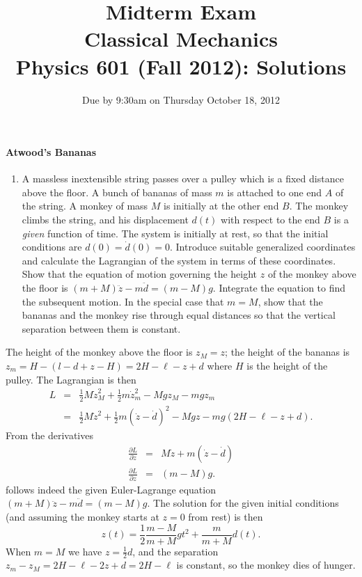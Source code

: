 \documentclass[letterpaper,11pt]{article}
\title{Midterm Exam \\ Classical Mechanics \\ Physics 601 (Fall 2012): Solutions}
\date{Due by 9:30am on Thursday October 18, 2012}
\begin{document}
\maketitle

\paragraph*{Atwood's Bananas}
\begin{enumerate}
 \item A massless inextensible string passes over a pulley which is a fixed distance above the floor.  A bunch of bananas of mass $m$ is attached to one end $A$ of the string.  A monkey of mass $M$ is initially at the other end $B$. The monkey climbs the string, and his displacement $d(t)$ with respect to the end $B$ is a \emph{given} function of time.  The system is initially at rest, so that the initial conditions are $d(0) = \dot{d}(0) = 0$.  Introduce suitable generalized coordinates and calculate the Lagrangian of the system in terms of these coordinates.  Show that the equation of motion governing the height $z$ of the monkey above the floor is $(m+M)\ddot{z} - m\ddot{d} = (m-M)g$.  Integrate the equation to find the subsequent motion.  In the special case that $m = M$, show that the bananas and the monkey rise through equal distances so that the vertical separation between them is constant.
\end{enumerate}
The height of the monkey above the floor is $z_M = z$; the height of the bananas is $z_m = H - (l - d + z - H) = 2 H - \ell - z + d$ where $H$ is the height of the pulley.  The Lagrangian is then
\begin{eqnarray*}
 L & = & \frac{1}{2} M \dot{z}_M^2 + \frac{1}{2} m \dot{z}_m^2 - Mgz_M - mgz_m \\
   & = & \frac{1}{2} M \dot{z}^2 + \frac{1}{2} m (\dot{z} - \dot{d})^2 - Mgz - mg(2H - \ell - z + d).
\end{eqnarray*}
From the derivatives
\begin{eqnarray*}
 \frac{\partial L}{\partial \dot{z}} & = & M \dot{z} + m (\dot{z} - \dot{d}) \\
 \frac{\partial L}{\partial z} & = & (m - M) g.
\end{eqnarray*}
follows indeed the given Euler-Lagrange equation $(m+M)\ddot{z} - m\ddot{d} = (m-M)g$.  The solution for the given initial conditions (and assuming the monkey starts at $z = 0$ from rest) is then
\begin{equation*}
 z(t) = \frac{1}{2} \frac{m - M}{m + M} g t^2 + \frac{m}{m + M} d(t).
\end{equation*}
When $m = M$ we have $z = \frac{1}{2} d$, and the separation $z_m - z_M = 2 H - \ell - 2 z + d = 2 H - \ell$ is constant, so the monkey dies of hunger.
\end{document}
